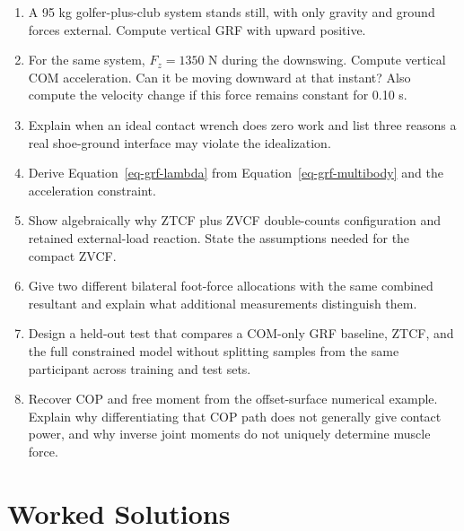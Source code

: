 \begin{enumerate}
\def\labelenumi{\arabic{enumi}.}
\item
  A 95 kg golfer-plus-club system stands still, with only gravity and ground forces external. Compute vertical GRF with upward positive.
\item
  For the same system, \(F_z=1350\) N during the downswing. Compute vertical COM acceleration. Can it be moving downward at that instant? Also compute the velocity change if this force remains constant for 0.10 s.
\item
  Explain when an ideal contact wrench does zero work and list three reasons a real shoe-ground interface may violate the idealization.
\item
  Derive Equation~\ref{eq-grf-lambda} from Equation~\ref{eq-grf-multibody} and the acceleration constraint.
\item
  Show algebraically why ZTCF plus ZVCF double-counts configuration and retained external-load reaction. State the assumptions needed for the compact ZVCF.
\item
  Give two different bilateral foot-force allocations with the same combined resultant and explain what additional measurements distinguish them.
\item
  Design a held-out test that compares a COM-only GRF baseline, ZTCF, and the full constrained model without splitting samples from the same participant across training and test sets.
\item
  Recover COP and free moment from the offset-surface numerical example. Explain why differentiating that COP path does not generally give contact power, and why inverse joint moments do not uniquely determine muscle force.
\end{enumerate}

\section{Worked Solutions}\label{grf-worked-solutions}

